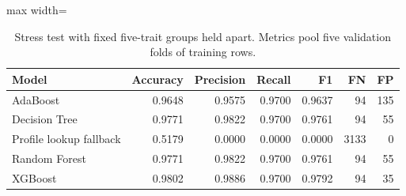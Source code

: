 \begin{table}[H]
\centering\small
\caption{Stress test with fixed five-trait groups held apart. Metrics pool five validation folds of training rows.}
\begin{adjustbox}{max width=\linewidth}\begin{tabular}{lrrrrrr}
\toprule
Model & Accuracy & Precision & Recall & F1 & FN & FP \\
\midrule
AdaBoost & 0.9648 & 0.9575 & 0.9700 & 0.9637 & 94 & 135 \\
Decision Tree & 0.9771 & 0.9822 & 0.9700 & 0.9761 & 94 & 55 \\
Profile lookup fallback & 0.5179 & 0.0000 & 0.0000 & 0.0000 & 3133 & 0 \\
Random Forest & 0.9771 & 0.9822 & 0.9700 & 0.9761 & 94 & 55 \\
XGBoost & 0.9802 & 0.9886 & 0.9700 & 0.9792 & 94 & 35 \\
\bottomrule
\end{tabular}\end{adjustbox}
\end{table}
